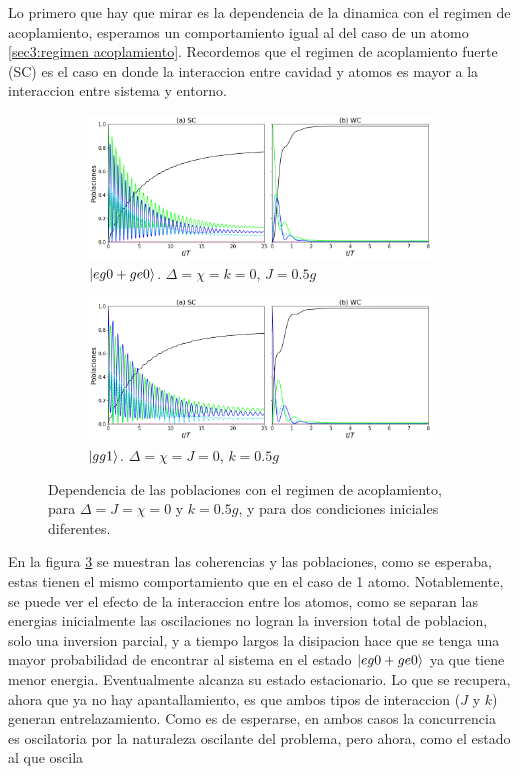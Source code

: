 Lo primero que hay que mirar es la dependencia de la dinamica con el regimen de acoplamiento, esperamos un comportamiento igual al del caso de un atomo \ref{sec3:regimen acoplamiento}. Recordemos que el regimen de acoplamiento fuerte (SC) es el caso en donde la interaccion entre cavidad y atomos es mayor a la interaccion entre sistema y entorno.
\begin{figure}[h]
    \centering
    \begin{subfigure}{0.7\textwidth}
        \includegraphics[width=\textwidth]{figuras/ch4/sc vs wc eg0 sim j0.5.png}
        \caption{$\ket{eg0+ge0}$. $\Delta=\chi=k=0$, $J=0.5g$}
        \label{fig4:acoplamiento eg0 sim}
    \end{subfigure}
    \vfill
    \begin{subfigure}{0.7\textwidth}
        \includegraphics[width=\textwidth]{figuras/ch4/sc vs wc gg1 k=0.5.png}
        \caption{$\ket{gg1}$. $\Delta=\chi=J=0$, $k=0.5g$ }
        \label{fig4:acoplamiento gg1}
    \end{subfigure}
    \caption{Dependencia de las poblaciones con el regimen de acoplamiento, para $\Delta=J=\chi=0$ y $k=0.5g$, y para dos condiciones iniciales diferentes.}
    \label{fig4:regimen acoplamiento}
\end{figure}
En  la figura \ref{fig4:regimen acoplamiento} se  muestran las coherencias y las poblaciones, como se esperaba, estas tienen el mismo comportamiento que en el caso de 1 atomo. Notablemente, se puede ver el efecto de la interaccion entre los atomos, como se separan las energias inicialmente las oscilaciones no logran la inversion total de poblacion, solo una inversion parcial, y a tiempo largos la disipacion hace que se tenga una mayor probabilidad de encontrar al sistema en el estado $\ket{eg0+ge0}$ ya que tiene menor energia. Eventualmente alcanza su estado estacionario. Lo que se recupera, ahora que ya no hay apantallamiento, es que ambos tipos de interaccion ($J$ y $k$) generan entrelazamiento. Como es de esperarse, en ambos casos la concurrencia es oscilatoria por la naturaleza oscilante del problema, pero ahora, como el estado al que oscila

